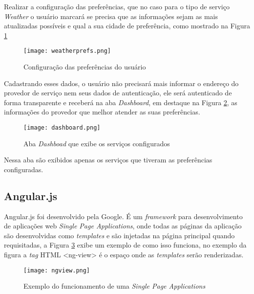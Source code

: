 Realizar a configuração das preferências, que no caso para o tipo de serviço \textit{Weather} o usuário marcará se precisa que as informações sejam as mais atualizadas possíveis e qual a sua cidade de preferência, como mostrado na Figura \ref{fig:weatherprefs}

\begin{figure}[!htb]
  \centering
  \texttt{[image: weatherprefs.png]} %
  \caption[Configuração das preferências do usuário]{Configuração das preferências do usuário}
  \label{fig:weatherprefs}
\end{figure}

Cadastrando esses dados, o usuário não precisará mais informar o endereço do provedor de serviço nem seus dados de autenticação, ele será autenticado de forma transparente e receberá na aba \textit{Dashboard}, em destaque na Figura \ref{fig:dashboard}, as informações do provedor que melhor atender as suas preferências.

\begin{figure}[!htb]
  \centering
  \texttt{[image: dashboard.png]} %
  \caption[Aba \textit{Dashboad} que exibe os serviços configurados]{Aba \textit{Dashboad} que exibe os serviços configurados}
  \label{fig:dashboard}
\end{figure}

Nessa aba são exibidos apenas os serviços que tiveram as preferências configuradas.

\subsection{Angular.js}
Angular.js foi desenvolvido pela Google. É um \textit{framework} para desenvolvimento de aplicações web \textit{Single Page Applications}, onde todas as páginas da aplicação são desenvolvidas como \textit{templates} e são injetadas na página principal quando requisitadas, a Figura \ref{fig:ngview} exibe um exemplo de como isso funciona, no exemplo da figura a \textit{tag} HTML <ng-view> é o espaço onde as \textit{templates} serão renderizadas.

\begin{figure}[!htb]
  \centering
  \texttt{[image: ngview.png]} %
  \caption[Exemplo do funcionamento de uma \textit{Single Page Applications}]{Exemplo do funcionamento de uma \textit{Single Page Applications}}
  \label{fig:ngview}
\end{figure}

